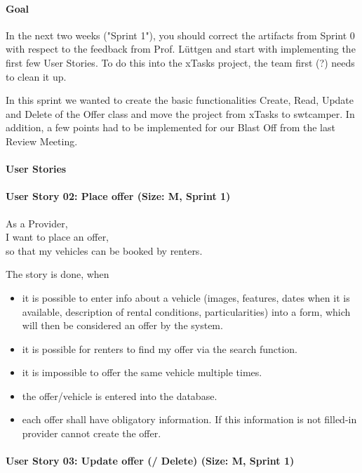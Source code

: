 \paragraph{Goal}
In the next two weeks ("Sprint 1"), you should correct the artifacts from Sprint 0 with respect 
to the feedback from Prof. Lüttgen and start with implementing the first few User Stories. To 
do this into the xTasks project, the team first (?) needs to clean it up.

In this sprint we wanted to create the basic functionalities Create, Read, Update and Delete 
of the Offer class and move the project from xTasks to swtcamper. In addition, a few points 
had to be implemented for our Blast Off from the last Review Meeting.

\paragraph{User Stories}
\paragraph{User Story 02: Place offer (Size: M, Sprint 1)}

As a Provider,\\
I want to place an offer,\\
so that my vehicles can be booked by renters.

The story is done, when
\begin{itemize}
    \item it is possible to enter info about a vehicle (images, features, dates when it is available, description of rental conditions, particularities) into a form, which will then be considered an offer by the system.
    \item it is possible for renters to find my offer via the search function.
    \item it is impossible to offer the same vehicle multiple times.
    \item the offer/vehicle is entered into the database.
    \item each offer shall have obligatory information. If this information is not filled-in provider cannot create the offer.
\end{itemize}


\paragraph{User Story 03: Update offer (/ Delete) (Size: M, Sprint 1)}

